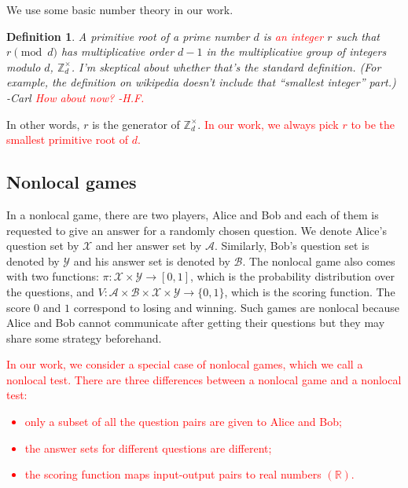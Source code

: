 \documentclass[11pt,letterpaper]{article}
\newcommand{\ket}[1]{|#1\rangle}
\newcommand{\ketbra}[2]{|#1\rangle\langle#2|}
\newcommand{\R}{\mathbb{R}}
\newcommand{\Z}{\mathbb{Z}}
\newcommand{\calX}{\mathcal{X}}
\newcommand{\calY}{\mathcal{Y}}
\newcommand{\calA}{\mathcal{A}}
\newcommand{\calB}{\mathcal{B}}
\newcommand{\Zd}{\Z_d^{\times}}
\newcommand{\1}{\mathbb{1}}
\newcommand{\EPR}[1]{\Sigma^{(#1)}}
\def\carl#1{{\color{blue} #1 -Carl}}
\newcommand{\hf}[1]{\textcolor{red}{#1}}
\newcommand{\hfc}[1]{\textcolor{red}{#1 -H.F.}}
\newtheorem{definition}[theorem]{Definition}
\theoremstyle{definition}
\begin{document}
We use some basic number theory in our work. 
\begin{definition}
A primitive root of a prime number
$d$ is \hf{an integer} $r$ such that $r \pmod{d}$ has multiplicative order $d-1$
in the multiplicative group of integers modulo $d$, $\Zd$.  \carl{I'm skeptical about whether that's the standard definition.  (For example, the definition on wikipedia doesn't include that ``smallest integer'' part.)}
\hfc{How about now?}
\end{definition}
In other words,
$r$ is the generator of $\Zd$.
\hf{In our work, we always pick $r$ to be the smallest primitive root of $d$.}



\subsection{Nonlocal games}
In a nonlocal game, there are two players, Alice and Bob and each of them is requested
to give an answer for a randomly chosen question. We denote Alice's question set by $\calX$ and her answer set by $\calA$. Similarly,
Bob's question set is denoted by $\calY$ and his answer set is denoted by $\calB$. The nonlocal game also
comes with two functions: $\pi: \calX \times \calY \rightarrow [0,1]$, which is the probability distribution over the questions,
and $V: \calA \times \calB \times \calX \times \calY \rightarrow \{0,1\}$, which is the scoring function. 
The score $0$ and $1$ correspond to losing and winning. 
Such games are nonlocal
because Alice and Bob cannot communicate after getting their questions but they may share some strategy beforehand. 

\hf{In our work, we consider a special case of nonlocal games, which we call a nonlocal test.
There are three differences between a nonlocal game and a nonlocal test:
\begin{itemize}
	\item only a subset of all the question pairs are given to Alice and Bob;
	\item the answer sets for different questions are different;
	\item the scoring function maps input-output pairs to real numbers $(\R)$.
\end{itemize}
}
\end{document}

